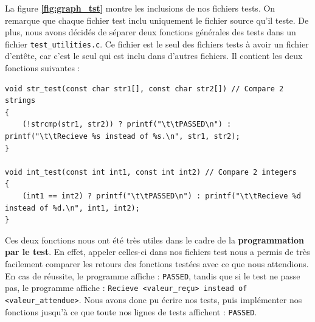         \newpage

        La figure \textbf{\ref{fig:graph_tst}} montre les inclusions de nos fichiers tests. On remarque que chaque fichier test inclu uniquement le fichier source qu'il teste. De plus, nous avons décidés de séparer deux fonctions générales des tests dans un fichier \texttt{test\_utilities.c}. Ce fichier est le seul des fichiers tests à avoir un fichier d'entête, car c'est le seul qui est inclu dans d'autres fichiers. Il contient les deux fonctions suivantes :
        
        \begin{lstlisting}
void str_test(const char str1[], const char str2[]) // Compare 2 strings
{ 
    (!strcmp(str1, str2)) ? printf("\t\tPASSED\n") : printf("\t\tRecieve %s instead of %s.\n", str1, str2);
}

void int_test(const int int1, const int int2) // Compare 2 integers
{
    (int1 == int2) ? printf("\t\tPASSED\n") : printf("\t\tRecieve %d instead of %d.\n", int1, int2);
}\end{lstlisting}

        Ces deux fonctions nous ont été très utiles dans le cadre de la \textbf{programmation par le test}. En effet, appeler celles-ci dans nos fichiers test nous a permis de très facilement comparer les retours des fonctions testées avec ce que nous attendions. En cas de réussite, le programme affiche : \texttt{PASSED}, tandis que si le test ne passe pas, le programme affiche : \texttt{Recieve <valeur\_reçu> instead of <valeur\_attendue>}.
        \medbreak
        Nous avons donc pu écrire nos tests, puis implémenter nos fonctions jusqu'à ce que toute nos lignes de tests affichent : \texttt{PASSED}.
        

        
    